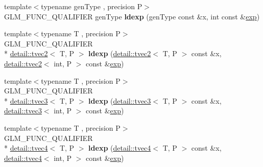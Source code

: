 \begin{DoxyCompactItemize}
\item 
\hypertarget{namespaceglm_a5c453639629fa99ccaa3438e455866b3}{{\footnotesize template$<$typename gen\-Type , precision P$>$ }\\G\-L\-M\-\_\-\-F\-U\-N\-C\-\_\-\-Q\-U\-A\-L\-I\-F\-I\-E\-R gen\-Type {\bfseries ldexp} (gen\-Type const \&x, int const \&\hyperlink{group__core__func__exponential_gae154699ba6bda068d4b87cf9b987381f}{exp})}\label{namespaceglm_a5c453639629fa99ccaa3438e455866b3}

\item 
\hypertarget{namespaceglm_af792ae464dc2c26112c9387f633d1c51}{{\footnotesize template$<$typename T , precision P$>$ }\\G\-L\-M\-\_\-\-F\-U\-N\-C\-\_\-\-Q\-U\-A\-L\-I\-F\-I\-E\-R \\*
\hyperlink{structglm_1_1detail_1_1tvec2}{detail\-::tvec2}$<$ T, P $>$ {\bfseries ldexp} (\hyperlink{structglm_1_1detail_1_1tvec2}{detail\-::tvec2}$<$ T, P $>$ const \&x, \hyperlink{structglm_1_1detail_1_1tvec2}{detail\-::tvec2}$<$ int, P $>$ const \&\hyperlink{group__core__func__exponential_gae154699ba6bda068d4b87cf9b987381f}{exp})}\label{namespaceglm_af792ae464dc2c26112c9387f633d1c51}

\item 
\hypertarget{namespaceglm_a81c3a6c6aed7a170864f9873dc422bc2}{{\footnotesize template$<$typename T , precision P$>$ }\\G\-L\-M\-\_\-\-F\-U\-N\-C\-\_\-\-Q\-U\-A\-L\-I\-F\-I\-E\-R \\*
\hyperlink{structglm_1_1detail_1_1tvec3}{detail\-::tvec3}$<$ T, P $>$ {\bfseries ldexp} (\hyperlink{structglm_1_1detail_1_1tvec3}{detail\-::tvec3}$<$ T, P $>$ const \&x, \hyperlink{structglm_1_1detail_1_1tvec3}{detail\-::tvec3}$<$ int, P $>$ const \&\hyperlink{group__core__func__exponential_gae154699ba6bda068d4b87cf9b987381f}{exp})}\label{namespaceglm_a81c3a6c6aed7a170864f9873dc422bc2}

\item 
\hypertarget{namespaceglm_a996ba8bb1830a08ebc28317b6dc71523}{{\footnotesize template$<$typename T , precision P$>$ }\\G\-L\-M\-\_\-\-F\-U\-N\-C\-\_\-\-Q\-U\-A\-L\-I\-F\-I\-E\-R \\*
\hyperlink{structglm_1_1detail_1_1tvec4}{detail\-::tvec4}$<$ T, P $>$ {\bfseries ldexp} (\hyperlink{structglm_1_1detail_1_1tvec4}{detail\-::tvec4}$<$ T, P $>$ const \&x, \hyperlink{structglm_1_1detail_1_1tvec4}{detail\-::tvec4}$<$ int, P $>$ const \&\hyperlink{group__core__func__exponential_gae154699ba6bda068d4b87cf9b987381f}{exp})}\label{namespaceglm_a996ba8bb1830a08ebc28317b6dc71523}


\end{DoxyCompactItemize}
